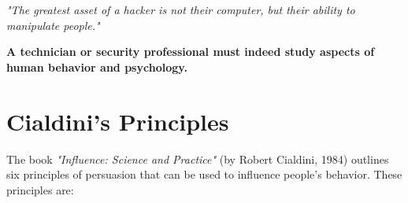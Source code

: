\vspace{0.5cm}

\begin{center}
    \textit{"The greatest asset of a hacker is not their computer, but their ability to manipulate people."}
\end{center}

\vspace{1 cm}

\begin{center}
    \textbf{A technician or security professional must indeed study aspects of human behavior and psychology.}
\end{center}

\section{Cialdini's Principles}
The book \textit{"Influence: Science and Practice"} (by Robert Cialdini, 1984) outlines six principles of persuasion that can be used to influence people's behavior. These principles are:

